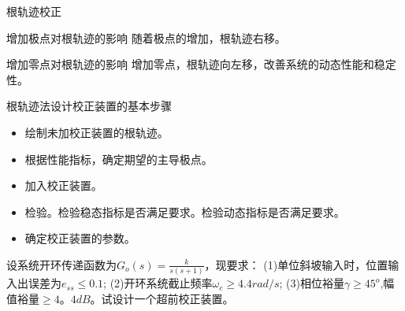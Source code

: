 \begin{frame}{根轨迹校正}
\begin{block}{增加极点对根轨迹的影响}
随着极点的增加，根轨迹右移。
\end{block}
\begin{block}{增加零点对根轨迹的影响}
增加零点，根轨迹向左移，改善系统的动态性能和稳定性。
\end{block}
\end{frame}

\begin{frame}{根轨迹法设计校正装置的基本步骤}
\begin{itemize}
\item 绘制未加校正装置的根轨迹。
\item 根据性能指标，确定期望的主导极点。
\item 加入校正装置。
\item 检验。检验稳态指标是否满足要求。检验动态指标是否满足要求。
\item 确定校正装置的参数。
\end{itemize}
\end{frame}
\begin{frame}
\begin{example}
设系统开环传递函数为$G_o(s)=\frac{k}{s(s+1)}$，现要求：
(1)单位斜坡输入时，位置输入出误差为$e_{ss}\leq 0.1$;
(2)开环系统截止频率$\omega_c\geq 4.4rad/s$;
(3)相位裕量$\gamma \geq 45^o$,幅值裕量$\geq 4。4dB$。试设计一个超前校正装置。
\end{example}
\end{frame}
